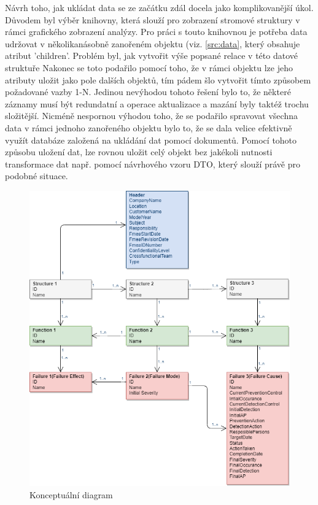 Návrh toho, jak ukládat data se ze začátku zdál docela jako komplikovanější úkol. Důvodem byl výběr knihovny, která slouží pro zobrazení stromové struktury v rámci grafického zobrazení analýzy. Pro práci s touto knihovnou je potřeba data udržovat v několikanásobně zanořeném objektu (viz. \ref{src:data}, který obsahuje atribut 'children'. Problém byl, jak vytvořit výše popsané relace v této datové struktuře Nakonec se toto podařilo pomocí toho, že v rámci objektu lze jeho atributy uložit jako pole dalších objektů, tím pádem šlo vytvořit tímto způsobem požadované vazby 1-N. Jedinou nevýhodou tohoto řešení bylo to, že některé záznamy musí být redundatní a operace aktualizace a mazání byly taktéž trochu složitější. Nicméně nespornou výhodou toho, že se podařilo spravovat všechna data v rámci jednoho zanořeného objektu bylo to, že se dala velice efektivně využít databáze založená na ukládání dat pomocí dokumentů. Pomocí tohoto způsobu uložení dat, lze rovnou uložit celý objekt bez jakékoli nutnosti transformace dat např. pomocí návrhového vzoru DTO, který slouží právě pro podobné situace. 

\begin{figure}[H]
\centering
	\includegraphics[width=1.0\textwidth]{Figures/db_model.png}
	\caption{Konceptuální diagram }
	\label{fig:db}
\end{figure}

